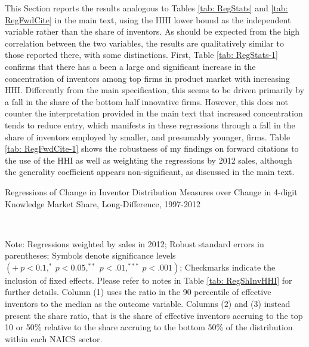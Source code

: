 This Section reports the results analogous to Tables \ref{tab: RegStats}
and \ref{tab: RegFwdCite} in the main text, using the HHI lower bound
as the independent variable rather than the share of inventors. As
should be expected from the high correlation between the two variables,
the results are qualitatively similar to those reported there, with
some distinctions. First, Table \ref{tab: RegStats-1} confirms that
there has a been a large and significant increase in the concentration
of inventors among top firms in product market with increasing HHI.
Differently from the main specification, this seems to be driven primarily
by a fall in the share of the bottom half innovative firms. However,
this does not counter the interpretation provided in the main text
that increased concentration tends to reduce entry, which manifests
in these regressions through a fall in the share of inventors employed
by smaller, and presumably younger, firms. Table \ref{tab: RegFwdCite-1}
shows the robustness of my findings on forward citations to the use
of the HHI as well as weighting the regressions by 2012 sales, although
the generality coefficient appears non-significant, as discussed in
the main text.

\begin{table}
\caption{Regressions of Change in Inventor Distribution Measures over Change
in 4-digit Knowledge Market Share, Long-Difference, 1997-2012\label{tab: RegStats-1}}

\begin{centering}
\scalebox{1}{}\\
\par\end{centering}
\raggedright{}{\small{}Note: Regressions weighted by sales in 2012;
Robust standard errors in parentheses; Symbols denote significance
levels $\left(+\ p<0.1,^{*}\ p<0.05,^{**}\ p<.01,^{***}\ p<.001\right)$;
Checkmarks indicate the inclusion of fixed effects. Please refer to
notes in Table \ref{tab: RegShInvHHI} for further details. Column
(1) uses the ratio in the 90 percentile of effective inventors to
the median as the outcome variable. Columns (2) and (3) instead present
the share ratio, that is the share of effective inventors accruing
to the top 10 or 50\% relative to the share accruing to the bottom
50\% of the distribution within each NAICS sector.}{\small\par}
\end{table}

